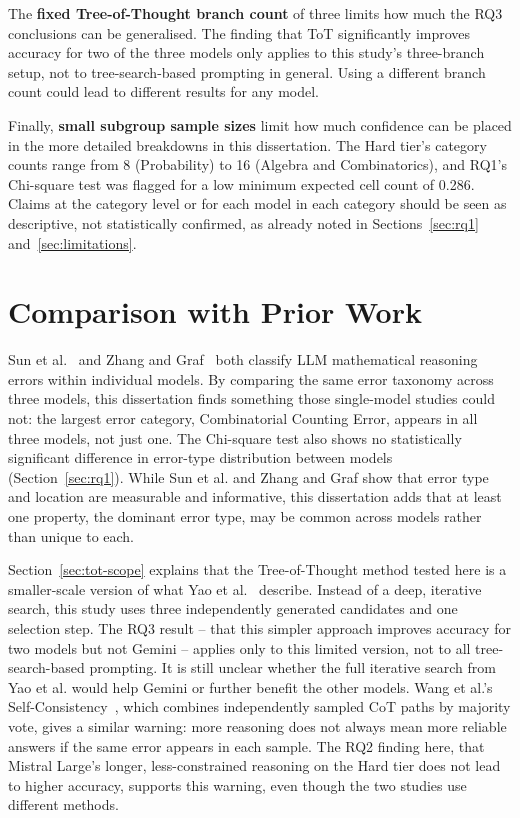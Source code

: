 The \textbf{fixed Tree-of-Thought branch count} of three limits how much
the RQ3 conclusions can be generalised. The finding that ToT
significantly improves accuracy for two of the three models only applies
to this study's three-branch setup, not to tree-search-based prompting
in general. Using a different branch count could lead to different
results for any model.

Finally, \textbf{small subgroup sample sizes} limit how much confidence
can be placed in the more detailed breakdowns in this dissertation. The
Hard tier's category counts range from 8 (Probability) to 16 (Algebra
and Combinatorics), and RQ1's Chi-square test was flagged for a low
minimum expected cell count of 0.286. Claims at the category level or
for each model in each category should be seen as descriptive, not
statistically confirmed, as already noted in Sections~\ref{sec:rq1}
and~\ref{sec:limitations}.

\section{Comparison with Prior Work}

Sun et al.~\cite{sun2025errorclassification} and Zhang and
Graf~\cite{zhang2025mathematical} both classify LLM mathematical
reasoning errors within individual models. By comparing the same error
taxonomy across three models, this dissertation finds something those
single-model studies could not: the largest error category, Combinatorial
Counting Error, appears in all three models, not just one. The
Chi-square test also shows no statistically significant difference in
error-type distribution between models (Section~\ref{sec:rq1}). While
Sun et al. and Zhang and Graf show that error type and location are
measurable and informative, this dissertation adds that at least one
property, the dominant error type, may be common across models rather
than unique to each.

Section~\ref{sec:tot-scope} explains that the Tree-of-Thought method
tested here is a smaller-scale version of what Yao et
al.~\cite{yao2023tree} describe. Instead of a deep, iterative search,
this study uses three independently generated candidates and one
selection step. The RQ3 result -- that this simpler approach improves
accuracy for two models but not Gemini -- applies only to this limited
version, not to all tree-search-based prompting. It is still unclear
whether the full iterative search from Yao et al. would help Gemini or
further benefit the other models. Wang et al.'s
Self-Consistency~\cite{wang2023selfconsistency}, which combines
independently sampled CoT
paths by majority vote, gives a similar warning: more reasoning does not
always mean more reliable answers if the same error appears in each
sample. The RQ2 finding here, that Mistral Large's longer,
less-constrained reasoning on the Hard tier does not lead to higher
accuracy, supports this warning, even though the two studies use
different methods.

